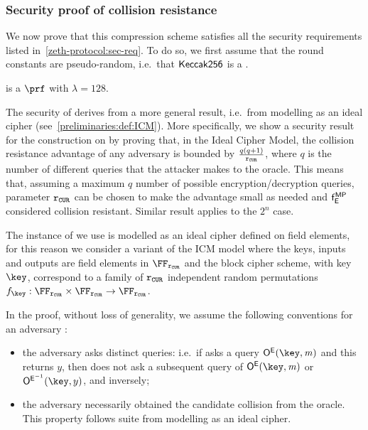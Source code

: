 \subsubsection{Security proof of \mimcMPPrime{} collision resistance}\label{instantiation:mkhash:security:colres-proof}
We now prove that this compression scheme satisfies all the security requirements listed in~\cref{zeth-protocol:sec-req}. To do so, we first assume that the round constants are pseudo-random, i.e.~that $\mathsf{Keccak{256}}$ is a \prf{}.

\begin{lemma}
	 is a $\prf$ with $\lambda=128$.
\end{lemma}

The security of \mimcMPPrime{} derives from a more general result, i.e.~from modelling \mimcPrime{} as an ideal cipher (see~\cref{preliminaries:def:ICM}). More specifically, we show a security result for the \MP{} construction on \FFx{\rCURVE} by proving that, in the Ideal Cipher Model, the collision resistance advantage of any adversary is bounded by $\frac{q(q+1)}{\mathtt{r_{CUR}}}$, where $q$ is the number of different queries that the attacker makes to the oracle. This means that, assuming a maximum $q$ number of possible encryption/decryption queries, parameter $\mathtt{r_{CUR}}$ can be chosen to make the advantage small as needed and $\mathsf{f}_{\mathsf{E}}^{\mathsf{MP}}$ considered collision resistant. Similar result applies to the ${2^n}$ case.

The instance of \mimc{} we use is modelled as an ideal cipher defined on field elements, for this reason we consider a variant of the ICM model where the keys, inputs and outputs are field elements in $\FFx{\rCURVE}$ and the block cipher scheme, with key $\key$, correspond to a family of $\mathtt{r_{CUR}}$ independent random permutations $f_{\key}: \FFx{\rCURVE} \times \FFx{\rCURVE} \to \FFx{\rCURVE}$.

In the proof, without loss of generality, we assume the following conventions for an adversary \adv{}:
\begin{itemize}
    \item the adversary asks distinct queries: i.e.~if \adv{} asks a query $\oracleEnc(\key,\msg)$ and this returns $y$, then \adv{} does not ask a subsequent query of $\oracleEnc(\key,\msg)$ or $\oracleDec(\key,y)$, and inversely;
    \item the adversary necessarily obtained the candidate collision from the oracle. This property follows suite from modelling \mimc{} as an ideal cipher.
\end{itemize}


